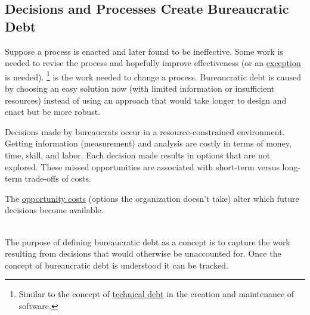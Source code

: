 \subsection*{Decisions and Processes Create Bureaucratic Debt\label{sec:bureaucratic-debt}}


Suppose a \gls{process} is enacted and later found to be ineffective. Some work is needed to revise the process and hopefully improve effectiveness (or an \hyperref[sec:exceptions-to-process]{exception} is needed).
\iftoggle{glossarysubstitutionworks}{\Gls{bureaucratic debt}}{Bureaucratic debt}\footnote{Similar to the concept of 
\href{https://en.wikipedia.org/wiki/Technical_debt}{technical debt} in the creation and maintenance of software\iftoggle{printedonpaper}{; see Wikipedia entry}{}.
} 
is 
\iftoggle{glossaryinmargin}{\marginpar{[Glossary]}}{}  the work needed to change a process.
Bureaucratic debt is caused by choosing an easy solution now (with limited information or insufficient resources) instead of using an approach that would take longer to design and enact but be more robust.


Decisions made by \glspl{bureaucrat} occur in a resource-constrained environment.
Getting information (measurement) and analysis are costly in terms of money, time, skill, and labor.
Each decision made results in options that are not explored. These missed opportunities are associated with short-term versus long-term trade-offs of costs.

The \href{https://en.wikipedia.org/wiki/Opportunity_cost}{opportunity costs}
(options the organization doesn't take) alter which future decisions become available.

\ \\

The purpose of defining bureaucratic debt as a concept is to capture the work resulting from decisions that would otherwise be unaccounted for.
Once the concept of bureaucratic debt is understood it can be tracked.

